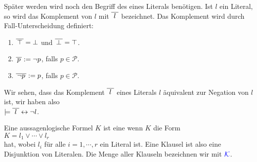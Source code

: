 Später werden wird noch den Begriff des  eines Literals benötigen.
Ist $l$ ein Literal, so wird das Komplement von $l$ mit $\overline{\,\,l\,\,}$
bezeichnet.  Das Komplement wird durch Fall-Unterscheidung definiert:
\begin{enumerate}
\item $\overline{\,\top\,} = \bot$ \quad und \quad $\overline{\,\bot\,} = \top$. 
\item $\overline{\,p\,} := \neg p$, \quad falls $p \in \mathcal{P}$.
\item $\overline{\,\neg p\,} := p$, \quad falls $p \in \mathcal{P}$.
\end{enumerate}
Wir sehen, dass das Komplement $\overline{\,\,l\,\,}$ eines Literals $l$ äquivalent zur
Negation von $l$ ist, wir haben also
\\[0.2cm]
\hspace*{1.3cm}
$\models \overline{\,\,l\,\,} \leftrightarrow \neg l$.

\begin{Definition}[Klausel]
  Eine aussagenlogische Formel $K$ ist eine  wenn $K$ die Form \\[0.2cm]
  \hspace*{1.3cm} $K = l_1 \vee \cdots \vee l_r$ \\[0.2cm]
  hat, wobei $l_i$ für alle $i=1,\cdots,r$ ein Literal ist.  Eine Klausel ist also eine
  Disjunktion von Literalen. 
  Die Menge aller Klauseln bezeichnen wir mit ${\color{blue}\mathcal{K}}$.
  \eox
\end{Definition}

